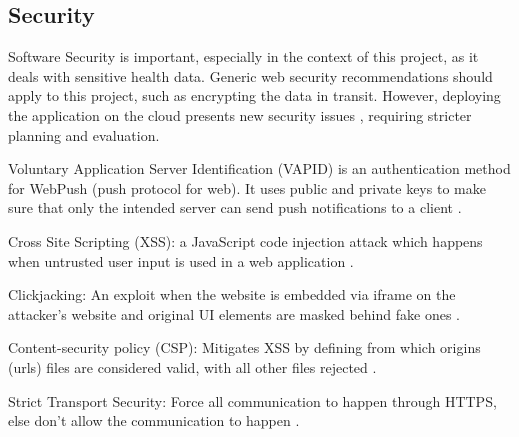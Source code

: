 \subsection{Security}
Software Security is important, especially in the context of this project, as it deals with sensitive health data. Generic web security recommendations should apply to this project, such as encrypting the data in transit. However, deploying the application on the cloud presents new security issues \cite{Zissis2012Addressing}, requiring stricter planning and evaluation.

Voluntary Application Server Identification (VAPID) is an authentication method for WebPush (push protocol for web). It uses public and private keys to make sure that only the intended server can send push notifications to a client \cite{vapid}.

Cross Site Scripting (XSS): a JavaScript code injection attack which happens when untrusted user input is used in a web application \cite{gupta2017cross}. 

Clickjacking: An exploit when the website is embedded via iframe on the attacker's website and original UI elements are masked behind fake ones \cite{clickjacking}.

Content-security policy (CSP): Mitigates XSS by defining from which origins (urls) files are considered valid, with all other files rejected \cite{csp}.

Strict Transport Security: Force all communication to happen through HTTPS, else don't allow the communication to happen \cite{hsts}. 
